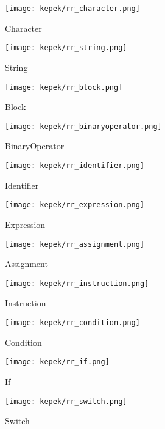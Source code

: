 \begin{figure}[h!]
\centering
\texttt{[image: kepek/rr\_character.png]}
\caption{Character}
\label{fig:rr_character}
\end{figure}

\begin{figure}[h!]
\centering
\texttt{[image: kepek/rr\_string.png]}
\caption{String}
\label{fig:rr_string}
\end{figure}

\begin{figure}[h!]
\centering
\texttt{[image: kepek/rr\_block.png]}
\caption{Block}
\label{fig:rr_block}
\end{figure}

\begin{figure}[h!]
\centering
\texttt{[image: kepek/rr\_binaryoperator.png]}
\caption{BinaryOperator}
\label{fig:rr_binaryoperator}
\end{figure}

\begin{figure}[h!]
\centering
\texttt{[image: kepek/rr\_identifier.png]}
\caption{Identifier}
\label{fig:rr_identifier}
\end{figure}

\begin{figure}[h!]
\centering
\texttt{[image: kepek/rr\_expression.png]}
\caption{Expression}
\label{fig:rr_expression}
\end{figure}

\begin{figure}[h!]
\centering
\texttt{[image: kepek/rr\_assignment.png]}
\caption{Assignment}
\label{fig:rr_assignment}
\end{figure}

\begin{figure}[h!]
\centering
\texttt{[image: kepek/rr\_instruction.png]}
\caption{Instruction}
\label{fig:rr_instruction}
\end{figure}

\begin{figure}[h!]
\centering
\texttt{[image: kepek/rr\_condition.png]}
\caption{Condition}
\label{fig:rr_condition}
\end{figure}

\begin{figure}[h!]
\centering
\texttt{[image: kepek/rr\_if.png]}
\caption{If}
\label{fig:rr_if}
\end{figure}

\begin{figure}[h!]
\centering
\texttt{[image: kepek/rr\_switch.png]}
\caption{Switch}
\label{fig:rr_switch}
\end{figure}

